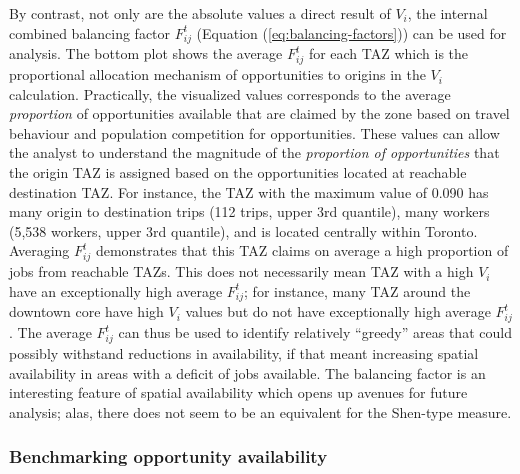 \documentclass[10pt,letterpaper]{article}
\begin{document}
By contrast, not only are the absolute values a direct result of
\(V_i\), the internal combined balancing factor \(F_{ij}^t\) (Equation
(\ref{eq:balancing-factors})) can be used for analysis. The bottom plot
shows the average \(F_{ij}^t\) for each TAZ which is the proportional
allocation mechanism of opportunities to origins in the \(V_i\)
calculation. Practically, the visualized values corresponds to the
average \emph{proportion} of opportunities available that are claimed by
the zone based on travel behaviour and population competition for
opportunities. These values can allow the analyst to understand the
magnitude of the \emph{proportion of opportunities} that the origin TAZ
is assigned based on the opportunities located at reachable destination
TAZ. For instance, the TAZ with the maximum value of 0.090 has many
origin to destination trips (112 trips, upper 3rd quantile), many
workers (5,538 workers, upper 3rd quantile), and is located centrally
within Toronto. Averaging \(F_{ij}^t\) demonstrates that this TAZ claims
on average a high proportion of jobs from reachable TAZs. This does not
necessarily mean TAZ with a high \(V_i\) have an exceptionally high
average \(F_{ij}^t\); for instance, many TAZ around the downtown core
have high \(V_i\) values but do not have exceptionally high average
\(F_{ij}^t\). The average \(F_{ij}^t\) can thus be used to identify
relatively ``greedy'' areas that could possibly withstand reductions in
availability, if that meant increasing spatial availability in areas
with a deficit of jobs available. The balancing factor is an interesting
feature of spatial availability which opens up avenues for future
analysis; alas, there does not seem to be an equivalent for the
Shen-type measure.

\hypertarget{benchmarking-opportunity-availability}{%
\subsubsection{Benchmarking opportunity
availability}\label{benchmarking-opportunity-availability}}
\end{document}

